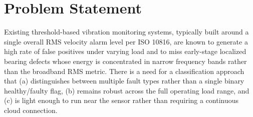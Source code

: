 \section{Problem Statement}
Existing threshold-based vibration monitoring systems, typically built around a single overall
RMS velocity alarm level per ISO 10816, are known to generate a high rate of false positives
under varying load and to miss early-stage localized bearing defects whose energy is
concentrated in narrow frequency bands rather than the broadband RMS metric. There is a need for
a classification approach that (a) distinguishes between multiple fault types rather than a
single binary healthy/faulty flag, (b) remains robust across the full operating load range, and
(c) is light enough to run near the sensor rather than requiring a continuous cloud connection.
